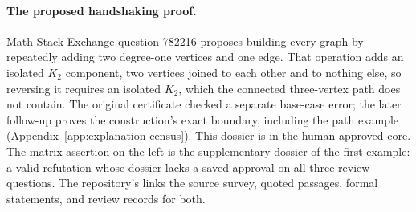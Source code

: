 \paragraph{The proposed handshaking proof.}
Math Stack Exchange question 782216 proposes building every graph by repeatedly adding two degree-one vertices and one edge. That operation adds an isolated $K_2$ component, two vertices joined to each other and to nothing else, so reversing it requires an isolated $K_2$, which the connected three-vertex path does not contain. The original certificate checked a separate base-case error; the later follow-up proves the construction's exact boundary, including the path example (Appendix~\ref{app:explanation-census}). This dossier is in the human-approved core. The matrix assertion on the left is the supplementary dossier of the first example: a valid refutation whose dossier lacks a saved approval on all three review questions. The repository's  links the source survey, quoted passages, formal statements, and review records for both.
